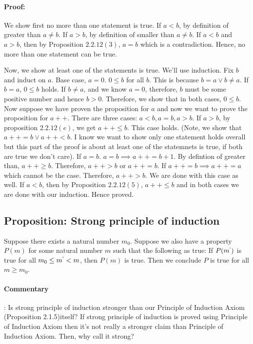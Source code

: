 \documentclass{report}
\begin{document}
\paragraph{Proof: } We show first no more than one statement is true. If $a < b$, by definition of greater than $a \ne b$. If $a > b$, by definition of smaller than $a \ne b$. If $a < b$ and $a > b$, then by Proposition $2.2.12(3)$, $a=b$ which is a contradiction. Hence, no more than one statement can be true.

Now, we show at least one of the statements is true. We'll use induction. Fix $b$ and induct on $a$. Base case, $a=0$. $0 \le b$ for all $b$. This is because  $b=a \lor b \ne a$. If $b=a$, $0 \le b$ holds. If $b \ne a$, and we know $a = 0$, therefore, $b$ must be some positive number and hence $b > 0$. Therefore, we show that in both cases, $0 \le b$. Now suppose we have proven the proposition for $a$ and now we want to prove the proposition for $a++$. There are three cases: $a < b, a=b, a > b$. If $a>b$, by proposition $2.2.12(e)$, we get $a++ \le b$. This case holds. (Note, we show that $a++ = b \lor a++ < b$. I know we want to show only one statement holds overall but this part of the proof is about at least one of the statemnets is true, if both are true we don't care). If $a = b$. $a=b \implies a++ = b+1$. By defintion of greater than, $a++ \ge b$. Therefore, $a++ > b$ or  $a++ = b$. If  $a++ = b \implies a++ = a $ which cannot be the case. Therefore,  $a++ > b$. We are done with this case as well. If  $a < b$, then by Proposition $2.2.12(5)$, $a++ \le b$ and in both cases we are done with our induction. Hence proved.   

\subsection{Proposition: Strong principle of induction}
Suppose there exists a natural number $m_0$. Suppose we also have a property $P(m)$ for some natural number $m$ such that the following as true: If $P(m^{`})$ is true for all $m_0 \le m^{`} < m$, then $P(m)$ is true. Then we conclude $P$ is true for all $m \ge m_0$.

\paragraph{Commentary}: Is strong principle of induction stronger than our Principle of Induction Axiom (Proposition 2.1.5)itself? If strong principle of induction is proved using Principle of Induction Axiom then it's not really a stronger claim than Principle of Induction Axiom. Then, why call it strong?
\end{document}
